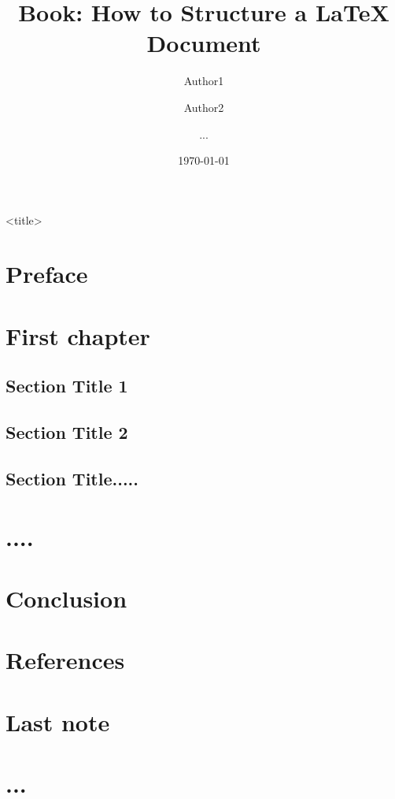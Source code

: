 \documentclass[11pt,a4paper]{book}
\begin{document}
\title{Book: How to Structure a LaTeX Document} <title>
\author{Author1 \and Author2 \and ...}
\date{\today}

\maketitle

\frontmatter

\chapter{Preface} 

\mainmatter
\chapter{First chapter}
\section{Section Title 1}
\section{Section Title 2}

\section{Section Title.....}

\chapter{....}

\chapter{Conclusion}

\chapter*{References}


\backmatter
\chapter{Last note}

\chapter{...}
\end{document}
